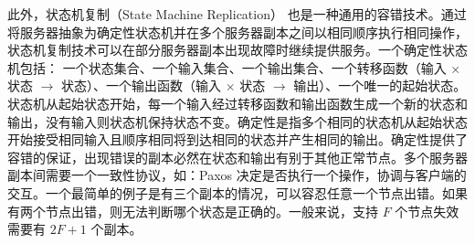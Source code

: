 此外，状态机复制（State Machine Replication） \cite{Lamport:1984:UTI:2993.2994, Schneider:1990:IFS:98163.98167} 也是一种通用的容错技术。通过将服务器抽象为确定性状态机并在多个服务器副本之间以相同顺序执行相同操作，状态机复制技术可以在部分服务器副本出现故障时继续提供服务。一个确定性状态机包括：
一个状态集合、一个输入集合、一个输出集合、一个转移函数（输入 $\times$ 状态 $\rightarrow$ 状态）、一个输出函数（输入 $\times$ 状态 $\rightarrow$ 输出）、一个唯一的起始状态。状态机从起始状态开始，每一个输入经过转移函数和输出函数生成一个新的状态和输出，没有输入则状态机保持状态不变。确定性是指多个相同的状态机从起始状态开始接受相同输入且顺序相同将到达相同的状态并产生相同的输出。确定性提供了容错的保证，出现错误的副本必然在状态和输出有别于其他正常节点。多个服务器副本间需要一个一致性协议，如：Paxos \cite{Lamport:1998:PP:279227.279229} 决定是否执行一个操作，协调与客户端的交互。一个最简单的例子是有三个副本的情况，可以容忍任意一个节点出错。如果有两个节点出错，则无法判断哪个状态是正确的。一般来说，支持 $F$ 个节点失效需要有 $2F + 1$ 个副本。